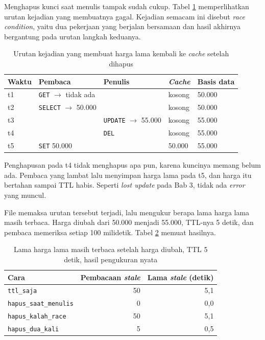Menghapus kunci saat menulis tampak sudah cukup. Tabel \ref{tab:race-condition}
memperlihatkan urutan kejadian yang membuatnya gagal. Kejadian semacam ini
disebut \textit{race condition}, yaitu dua pekerjaan yang berjalan bersamaan
dan hasil akhirnya bergantung pada urutan langkah keduanya.

\begin{table}[!htb]
  \centering
  \caption{Urutan kejadian yang membuat harga lama kembali ke \textit{cache}
           setelah dihapus}
  \label{tab:race-condition}
  \begin{tabularx}{\textwidth}{lXXll}
    \hline
    \textbf{Waktu} & \textbf{Pembaca} & \textbf{Penulis} & \textbf{\textit{Cache}} & \textbf{Basis data} \\
    \hline
    t1 & \texttt{GET} $\rightarrow$ tidak ada & & kosong & 50.000 \\
    \hline
    t2 & \texttt{SELECT} $\rightarrow$ 50.000 & & kosong & 50.000 \\
    \hline
    t3 & & \texttt{UPDATE} $\rightarrow$ 55.000 & kosong & 55.000 \\
    \hline
    t4 & & \texttt{DEL} & kosong & 55.000 \\
    \hline
    t5 & \texttt{SET} 50.000 & & 50.000 & 55.000 \\
    \hline
  \end{tabularx}
\end{table}

Penghapusan pada t4 tidak menghapus apa pun, karena kuncinya memang belum ada.
Pembaca yang lambat lalu menyimpan harga lama pada t5, dan harga itu bertahan
sampai TTL habis. Seperti \textit{lost update} pada Bab 3, tidak ada \textit{error} yang
muncul.

File  memaksa urutan tersebut terjadi,
lalu mengukur berapa lama harga lama masih terbaca. Harga diubah dari 50.000
menjadi 55.000, TTL-nya 5 detik, dan pembaca memeriksa setiap 100 milidetik.
Tabel \ref{tab:hasil-invalidasi} memuat hasilnya.

\begin{table}[!htb]
  \centering
  \caption{Lama harga lama masih terbaca setelah harga diubah, TTL 5 detik,
           hasil pengukuran nyata}
  \label{tab:hasil-invalidasi}
  \begin{tabularx}{\textwidth}{Xrr}
    \hline
    \textbf{Cara} & \textbf{Pembacaan \textit{stale}} & \textbf{Lama \textit{stale} (detik)} \\
    \hline
    \texttt{ttl\_saja} & 50 & 5,1 \\
    \hline
    \texttt{hapus\_saat\_menulis} & 0 & 0,0 \\
    \hline
    \texttt{hapus\_kalah\_race} & 50 & 5,1 \\
    \hline
    \texttt{hapus\_dua\_kali} & 5 & 0,5 \\
    \hline
  \end{tabularx}
\end{table}

